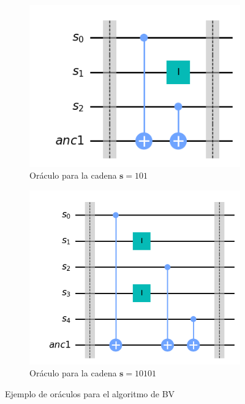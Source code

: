  \begin{figure}[H]
    \centering
    \begin{subfigure}[H]{0.35\textwidth}
        \centering
        \includegraphics[width=\textwidth]{TFG/imagenes/BVgate1.png}
        \caption{Oráculo para la cadena $\mathbf{s}=101$}
        \label{sFig:BVgate1}
    \end{subfigure}
    \hspace{10pt}
    \begin{subfigure}[H]{0.35\textwidth}
        \centering
        \includegraphics[width=\textwidth]{TFG/imagenes/BVgate2.png}
        \caption{Oráculo para la cadena $\mathbf{s}=10101$}
        \label{sFig:BVgate2}
    \end{subfigure}
        \caption{Ejemplo de oráculos para el algoritmo de BV}
    \label{FIG:BVOraculo}
 \end{figure}


